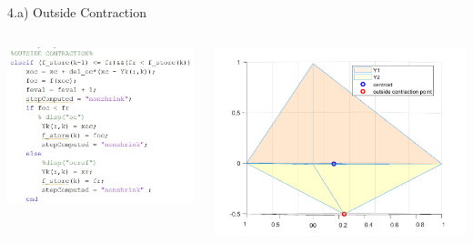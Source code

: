 \documentclass{beamer}
\begin{document}
\begin{frame}{4.a) Outside Contraction}
	\begin{columns}
	\begin{column}{0.39\linewidth}
		\centering
		\includegraphics[width=0.95\linewidth]{OC}
	\end{column}
	\begin{column}{0.59\linewidth}
		\centering
		\includegraphics[width=0.95\linewidth]{OCFig}
	\end{column}
	\end{columns}
\end{frame}
\end{document}
